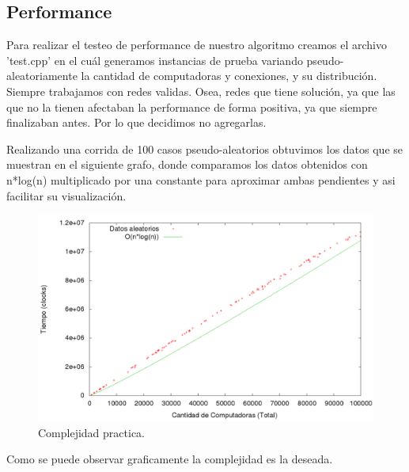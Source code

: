 \subsection{Performance}

Para realizar el testeo de performance de nuestro algoritmo creamos el archivo 'test.cpp' en el cu\'al generamos instancias de prueba variando pseudo-aleatoriamente la cantidad de computadoras y conexiones, y su distribuci\'on. Siempre trabajamos con redes validas. Osea, redes que tiene solución, ya que las que no la tienen afectaban la performance de forma positiva, ya que siempre finalizaban antes. Por lo que decidimos no agregarlas.

Realizando una corrida de 100 casos pseudo-aleatorios obtuvimos los datos que se muestran en el siguiente grafo, donde comparamos los datos obtenidos con n*log(n) multiplicado por una constante para aproximar ambas pendientes y asi facilitar su visualización.

\begin{figure}[H]
\begin{center}
\includegraphics[scale=.45]{./imagenes/ej3_chartRendimiento.png}
\caption{Complejidad practica.}
\end{center}
\end{figure}

Como se puede observar graficamente la complejidad es la deseada.






